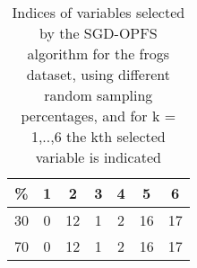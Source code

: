 \begin{table}
	\begin{center}
		\begin{tabular}{c c c c c c c}
			\% & 1 & 2 & 3 & 4 & 5 & 6 \\
			\hline
			30 & 0 & 12 & 1 & 2 & 16 & 17 \\
			70 & 0 & 12 & 1 & 2 & 16 & 17 \\
		\end{tabular}
	\end{center}
	\caption{Indices of variables selected by the SGD-OPFS algorithm for the frogs dataset, using different random sampling percentages, and for k = 1,..,6 the kth selected variable is indicated}
\end{table}